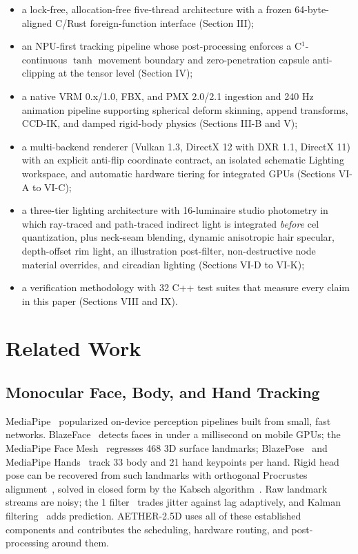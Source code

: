 \documentclass[conference]{IEEEtran}
\begin{document}
\begin{itemize}
\item a lock-free, allocation-free five-thread architecture with a frozen 64-byte-aligned C/Rust foreign-function interface (Section III);
\item an NPU-first tracking pipeline whose post-processing enforces a C$^1$-continuous $\tanh$ movement boundary and zero-penetration capsule anti-clipping at the tensor level (Section IV);
\item a native VRM 0.x/1.0, FBX, and PMX 2.0/2.1 ingestion and 240 Hz animation pipeline supporting spherical deform skinning, append transforms, CCD-IK, and damped rigid-body physics (Sections III-B and V);
\item a multi-backend renderer (Vulkan 1.3, DirectX 12 with DXR 1.1, DirectX 11) with an explicit anti-flip coordinate contract, an isolated schematic Lighting workspace, and automatic hardware tiering for integrated GPUs (Sections VI-A to VI-C);
\item a three-tier lighting architecture with 16-luminaire studio photometry in which ray-traced and path-traced indirect light is integrated \textit{before} cel quantization, plus neck-seam blending, dynamic anisotropic hair specular, depth-offset rim light, an illustration post-filter, non-destructive node material overrides, and circadian lighting (Sections VI-D to VI-K);
\item a verification methodology with 32 C++ test suites that measure every claim in this paper (Sections VIII and IX).
\end{itemize}


\section{Related Work}

\subsection{Monocular Face, Body, and Hand Tracking}
MediaPipe~\cite{mediapipe} popularized on-device perception pipelines built from small, fast networks. BlazeFace~\cite{blazeface} detects faces in under a millisecond on mobile GPUs; the MediaPipe Face Mesh~\cite{facemesh} regresses 468 3D surface landmarks; BlazePose~\cite{blazepose} and MediaPipe Hands~\cite{mphands} track 33 body and 21 hand keypoints per hand. Rigid head pose can be recovered from such landmarks with orthogonal Procrustes alignment~\cite{gower}, solved in closed form by the Kabsch algorithm~\cite{kabsch}. Raw landmark streams are noisy; the 1\texteuro{} filter~\cite{oneeuro} trades jitter against lag adaptively, and Kalman filtering~\cite{kalman} adds prediction. AETHER-2.5D uses all of these established components and contributes the scheduling, hardware routing, and post-processing around them.
\end{document}
